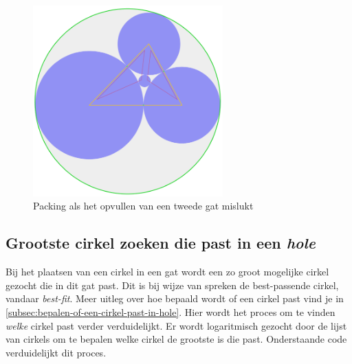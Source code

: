 \documentclass[12pt,a4paper,oneside]{book}
\begin{document}
\begin{figure}
  \centering
  \includegraphics[width=0.65\textwidth]{voorbeeld-gat-stap-3alt.png}
  \caption{Packing als het opvullen van een tweede gat mislukt} \label{fig:voorbeeld-gat-stap-3alt} 
\end{figure}

\subsection{Grootste cirkel zoeken die past in een \textit{hole}} \label{sec:grootste-cirkel-zoeken-die-past-in-een-hole}

Bij het plaatsen van een cirkel in een gat wordt een zo groot mogelijke cirkel gezocht die in dit gat past.
Dit is bij wijze van spreken de best-passende cirkel, vandaar \textit{best-fit}.
Meer uitleg over hoe bepaald wordt of een cirkel past vind je in \autoref{subsec:bepalen-of-een-cirkel-past-in-hole}.
Hier wordt het proces om te vinden \textit{welke} cirkel past verder verduidelijkt.
Er wordt logaritmisch gezocht door de lijst van cirkels om te bepalen welke cirkel de grootste is die past.
Onderstaande code verduidelijkt dit proces.
\end{document}
